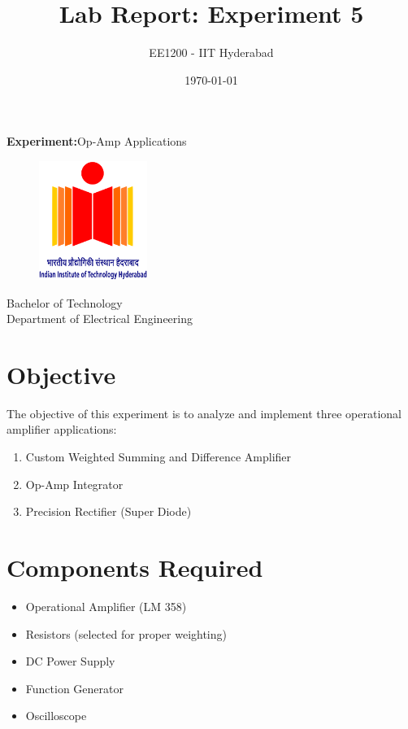 \documentclass[a4paper,12pt]{article}
\title{\textbf{Lab Report: Experiment 5}}
\author{EE1200 - IIT Hyderabad}
\date{\today}
\begin{document}
\maketitle

\begin{center}
    \textbf{Experiment:}Op-Amp Applications
\end{center}
\vspace{30pt}

\begin{figure}[h!]
    \centering
    \includegraphics[width = 100pt]{.logo/logo.png}\\
\end{figure}

\begin{center}
    Bachelor of Technology\\
    \vspace{10pt}
    Department of Electrical Engineering\\
\end{center}
\newpage

\section*{Objective}
The objective of this experiment is to analyze and implement three operational amplifier applications:
\begin{enumerate}
    \item Custom Weighted Summing and Difference Amplifier
    \item Op-Amp Integrator
    \item Precision Rectifier (Super Diode)
\end{enumerate}

\section*{Components Required}
\begin{itemize}
	\item Operational Amplifier (LM 358)
    \item Resistors (selected for proper weighting)
    \item DC Power Supply
    \item Function Generator
    \item Oscilloscope
\end{itemize}
\end{document}
